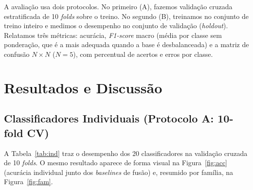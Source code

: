 \documentclass[12pt]{article}
\begin{document}
A avaliação usa dois protocolos. No primeiro (A), fazemos validação cruzada
estratificada de 10 \textit{folds} sobre o treino. No segundo (B), treinamos no
conjunto de treino inteiro e medimos o desempenho no conjunto de validação
(\textit{holdout}). Relatamos três métricas: acurácia, \textit{F1-score} macro
(média por classe sem ponderação, que é a mais adequada quando a base é
desbalanceada) e a matriz de confusão $N\times N$ ($N=5$), com percentual de
acertos e erros por classe.

\section{Resultados e Discussão}

\subsection{Classificadores Individuais (Protocolo A: 10-fold CV)}

A Tabela~\ref{tab:ind} traz o desempenho dos 20 classificadores na validação
cruzada de 10 \textit{folds}. O mesmo resultado aparece de forma visual na
Figura~\ref{fig:acc} (acurácia individual junto dos \textit{baselines} de fusão)
e, resumido por família, na Figura~\ref{fig:fam}.
\end{document}

